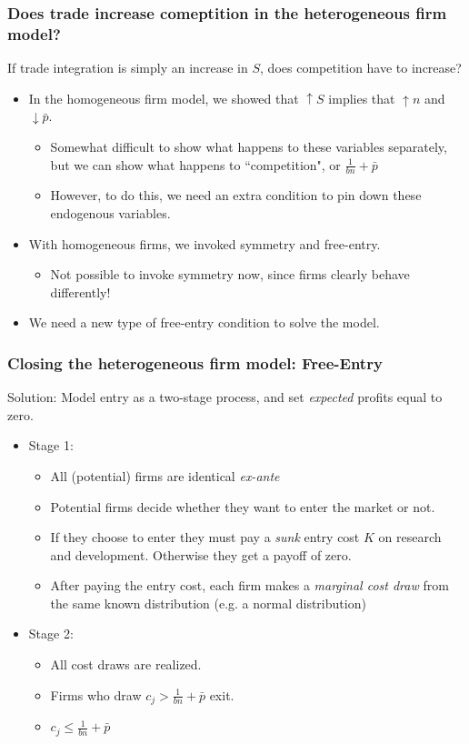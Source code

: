 \documentclass{beamer}
\begin{document}
\begin{frame}
	\frametitle{Does trade increase comeptition in the heterogeneous firm model?}
If trade integration is simply an increase in $S$, does competition have to increase?
	\begin{itemize}
		\item In the homogeneous firm model, we showed that $\uparrow S$ implies that $\uparrow n$ and $\downarrow \bar{p}$.
			\begin{itemize}
				\item Somewhat difficult to show what happens to these variables separately, but we can show what happens to ``competition", or $\frac{1}{bn} +\bar{p}$
				\item However, to do this, we need an extra condition to pin down these endogenous variables.
			\end{itemize}
			\item With homogeneous firms, we invoked symmetry and free-entry.
					\begin{itemize}
						\item Not possible to invoke symmetry now, since firms clearly behave differently!
					\end{itemize}
					\item We need a new type of free-entry condition to solve the model. 
	\end{itemize}
	
\end{frame}

\begin{frame}
	\frametitle{Closing the heterogeneous firm model: Free-Entry}
	Solution: Model entry as a two-stage process, and set \emph{expected} profits equal to zero.
	\begin{itemize}
		\item Stage 1:
		\begin{itemize}
			\footnotesize
			\item All (potential) firms are identical \emph{ex-ante} 
			\item Potential firms decide whether they want to enter the market or not.
			\item If they choose to enter they must pay a \emph{sunk} entry cost $K$  on research and development. Otherwise they get a payoff of zero. 
			\item After paying the entry cost, each firm makes a \emph{marginal cost draw} from the same known distribution (e.g. a normal distribution)
		\end{itemize}
		\item Stage 2:
		\begin{itemize}
			\footnotesize
			\item All cost draws are realized.
			\item Firms who draw  $c_j >\frac{1}{bn}+\bar{p}$ exit.
			\item $c_j \leq\frac{1}{bn}+\bar{p}$
		\end{itemize}
	\end{itemize}
\end{frame}
\end{document}

